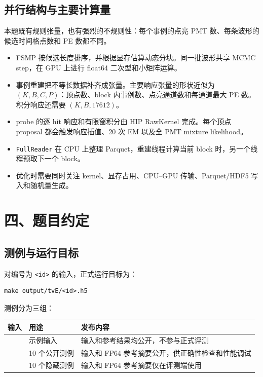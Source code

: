 \documentclass[UTF8,a4paper,11pt]{ctexart}
\providecommand{\tightlist}{%
  \setlength{\itemsep}{0pt}\setlength{\parskip}{0pt}}
\begin{document}
\subsection{并行结构与主要计算量}

本题既有规则张量，也有强烈的不规则性：每个事例的点亮 PMT 数、每条波形的候选时间格点数和 PE 数都不同。

\begin{itemize}
\tightlist
\item
  FSMP 按候选长度排序，并根据显存估算动态分块。同一批波形共享 MCMC step，在 GPU 上进行 float64 二次型和小矩阵运算。
\item
  事例重建把不等长数据补齐成张量。主要响应张量的形状近似为 \((K,B,C,P)\)：顶点数、block 内事例数、点亮通道数和每通道最大 PE 数。积分响应还需要 \((K,B,17612)\)。
\item
  probe 的逐 hit 响应和有限窗积分由 HIP RawKernel 完成。每个顶点 proposal 都会触发响应插值、20 次 EM 以及全 PMT mixture likelihood。
\item
  \texttt{FullReader} 在 CPU 上整理 Parquet，重建线程计算当前 block 时，另一个线程预取下一个 block。
\item
  优化时需要同时关注 kernel、显存占用、CPU--GPU 传输、Parquet/HDF5 写入和随机量生成。
\end{itemize}

\section{四、题目约定}

\subsection{测例与运行目标}

对编号为 \texttt{<id>} 的输入，正式运行目标为：

\begin{verbatim}
make output/tvE/<id>.h5
\end{verbatim}

测例分为三组：

\begin{longtable}[]{@{}L{0.20\textwidth}L{0.22\textwidth}L{0.51\textwidth}@{}}
\toprule\noalign{}
输入 & 用途 & 发布内容 \\
\midrule\noalign{}
\endhead
\bottomrule\noalign{}
\endlastfoot
{} & 示例输入 & 输入和参考结果均公开，不参与正式评测 \\
 & 10 个公开测例 & 输入和 FP64 参考摘要公开，供正确性检查和性能调试 \\
 & 10 个隐藏测例 & 输入和 FP64 参考摘要仅在评测端使用 \\
\end{longtable}
\end{document}
